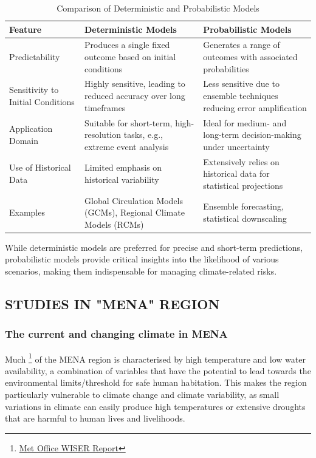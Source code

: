 \begin{table}[h!]
    \centering
    \caption{Comparison of Deterministic and Probabilistic Models}
    \label{tab:comparison_models}
    \begin{tabular}{@{}p{5cm}p{5cm}p{5cm}@{}}
    \toprule
    \textbf{Feature} & \textbf{Deterministic Models} & \textbf{Probabilistic Models} \\
    \midrule
    Predictability & Produces a single fixed outcome based on initial conditions & Generates a range of outcomes with associated probabilities \\
    \addlinespace
    Sensitivity to Initial Conditions & Highly sensitive, leading to reduced accuracy over long timeframes & Less sensitive due to ensemble techniques reducing error amplification \\
    \addlinespace
    Application Domain & Suitable for short-term, high-resolution tasks, e.g., extreme event analysis & Ideal for medium- and long-term decision-making under uncertainty \\
    \addlinespace
    Use of Historical Data & Limited emphasis on historical variability & Extensively relies on historical data for statistical projections \\
    \addlinespace
    Examples & Global Circulation Models (GCMs), Regional Climate Models (RCMs) & Ensemble forecasting, statistical downscaling \\
    \bottomrule
    \end{tabular}
\end{table}

\noindent While deterministic models are preferred for precise and short-term predictions, probabilistic models provide critical insights into the likelihood of various scenarios, making them indispensable for managing climate-related risks.



\subsection{ STUDIES IN "MENA" REGION }
\subsubsection{The current and changing climate in MENA}
Much \footnote{\href{https://www.metoffice.gov.uk/binaries/content/assets/metofficegovuk/pdf/business/international/wiser/wiser-mena-scoping-study-external-v2.pdf}{Met Office WISER Report}} of the MENA region is characterised by high temperature and low water availability, a
combination of variables that have the potential to lead towards the environmental
limits/threshold for safe human habitation. This makes the region
particularly vulnerable to climate change and climate variability, as small variations in climate
can easily produce high temperatures or extensive droughts that are harmful to human lives
and livelihoods.\\

